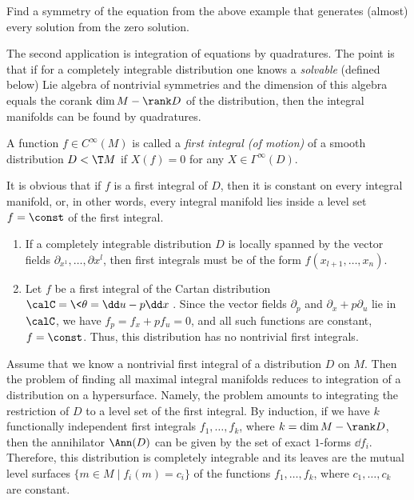 \begin{xca}
    Find a symmetry of the equation from the above example that generates (almost) every solution from the zero solution.
\end{xca}

The second application is integration of equations by quadratures. The point is that if for a completely integrable distribution one knows a \emph{solvable} (defined below) Lie algebra of nontrivial symmetries and the dimension of this algebra equals the corank $\dim M-\rank D$ of the distribution, then the integral manifolds can be found by quadratures.

\begin{defn}
    A function $f\in C^\infty(M)$ is called a \emph{first integral (of motion)} of a smooth distribution $D<\T M$ if $X(f)=0$ for any $X\in\Gamma^\infty(D)$.
\end{defn}

It is obvious that if $f$ is a first integral of $D$, then it is constant on every integral manifold, or, in other words, every integral manifold lies inside a level set $f=\const$ of the first integral.

\begin{example}
    \begin{enumerate}
        \item If a completely integrable distribution $D$ is locally spanned by the vector fields $\partial_{x^1},\ldots,\partial{x^l}$, then first integrals must be of the form $f(x_{l+1},\ldots,x_n)$. 
        \item Let $f$ be a first integral of the Cartan distribution $\calC=\<\theta=\dd u-p\dd x\>$. Since the vector fields $\partial_p$ and $\partial_x+p\partial_u$ lie in $\calC$, we have $f_p=f_x+pf_u=0$, and all such functions are constant, $f=\const$. Thus, this distribution has no nontrivial first integrals.
    \end{enumerate}
\end{example}

Assume that we know a nontrivial first integral of a distribution $D$ on $M$. Then the problem of finding all maximal integral manifolds reduces to integration of a distribution on a hypersurface. Namely, the problem amounts to integrating the restriction of $D$ to a level set of the first integral. By induction, if we have $k$ functionally independent first integrals $f_1,\ldots,f_k$, where $k=\dim M-\rank D$, then the annihilator $\Ann(D)$ can be given by the set of exact $1$-forms $\dd f_i$. Therefore, this distribution is completely integrable and its leaves are the mutual level surfaces $\{m\in M\mid f_i(m)=c_i\}$ of the functions $f_1,\ldots,f_k$, where $c_1,\ldots,c_k$ are constant.


